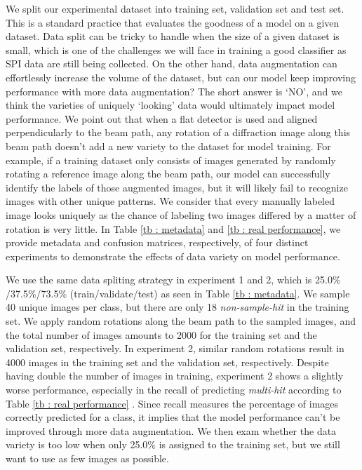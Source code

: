 We split our experimental dataset into training set, validation set and test
set.  This is a standard practice that evaluates the goodness of a model on a
given dataset.  Data split can be tricky to handle when the size of a given
dataset is small, which is one of the challenges we will face in training a good
classifier as SPI data are still being collected.  On the other hand, data
augmentation can effortlessly increase the volume of the dataset, but can our
model keep improving performance with more data augmentation?  The short answer
is `NO', and we think the varieties of uniquely `looking' data would ultimately
impact model performance.  We point out that when a flat detector is used and
aligned perpendicularly to the beam path, any rotation of a diffraction image
along this beam path doesn't add a new variety to the dataset for model
training.  For example, if a training dataset only consists of images generated
by randomly rotating a reference image along the beam path, our model can
successfully identify the labels of those augmented images, but it will likely
fail to recognize images with other unique patterns.  We consider that every
manually labeled image looks uniquely as the chance of labeling two images
differed by a matter of rotation is very little.  In Table \ref{tb : metadata}
and \ref{tb : real performance}, we provide metadata and confusion matrices,
respectively, of four distinct experiments to demonstrate the effects of data
variety on model performance.  

We use the same data spliting strategy in experiment 1 and 2, which is 25.0\%
/37.5\%/73.5\% (train/validate/test) as seen in Table \ref{tb : metadata}.  We
sample 40 unique images per class, but there are only 18 \textit{non-sample-hit}
in the training set.  We apply random rotations along the beam path to the
sampled images, and the total number of images amounts to 2000 for the training
set and the validation set, respectively.  In experiment 2, similar random
rotations result in 4000 images in the training set and the validation set,
respectively.  Despite having double the number of images in training,
experiment 2 shows a slightly worse performance, especially in the recall of
predicting \textit{multi-hit} according to Table \ref{tb : real performance} .
Since recall measures the percentage of images correctly predicted for a class,
it implies that the model performance can't be improved through more data
augmentation.  We then exam whether the data variety is too low when only 25.0\%
is assigned to the training set, but we still want to use as few images as
possible.  

